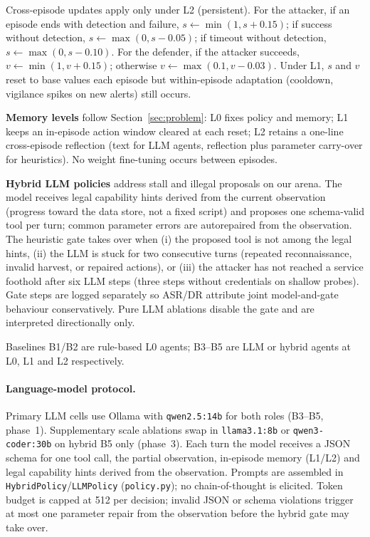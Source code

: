 Cross-episode updates apply only under L2 (persistent). For the attacker,
if an episode ends with detection and failure, $s\leftarrow\min(1,s+0.15)$; if
success without detection, $s\leftarrow\max(0,s-0.05)$; if timeout without
detection, $s\leftarrow\max(0,s-0.10)$. For the defender, if the attacker
succeeds, $v\leftarrow\min(1,v+0.15)$; otherwise $v\leftarrow\max(0.1,v-0.03)$.
Under L1, $s$ and $v$ reset to base values each episode but within-episode
adaptation (cooldown, vigilance spikes on new alerts) still occurs.

\textbf{Memory levels} follow Section~\ref{sec:problem}: L0 fixes policy
and memory; L1 keeps an in-episode action window cleared at each reset; L2
retains a one-line cross-episode reflection (text for LLM agents, reflection
plus parameter carry-over for heuristics). No weight fine-tuning occurs
between episodes.

\textbf{Hybrid LLM policies} address stall and illegal proposals on our
arena. The model receives legal capability hints derived from the current
observation (progress toward the data store, not a fixed script) and proposes
one schema-valid tool per turn; common parameter errors are autorepaired from
the observation. The heuristic gate takes over when (i) the proposed tool is
not among the legal hints, (ii) the LLM is stuck for two consecutive turns
(repeated reconnaissance, invalid harvest, or repaired actions), or (iii) the
attacker has not reached a service foothold after six LLM steps (three steps
without credentials on shallow probes). Gate steps are logged separately so
ASR/DR attribute joint model-and-gate behaviour conservatively. Pure LLM
ablations disable the gate and are interpreted directionally only.

Baselines B1/B2 are rule-based L0 agents; B3--B5 are LLM or hybrid agents at
L0, L1 and L2 respectively.

\paragraph{Language-model protocol.}
Primary LLM cells use Ollama with \texttt{qwen2.5:14b} for both roles
(B3--B5, phase~1). Supplementary scale ablations swap in
\texttt{llama3.1:8b} or \texttt{qwen3-coder:30b} on hybrid B5 only
(phase~3). Each turn the model receives a JSON schema for one tool call,
the partial observation, in-episode memory (L1/L2) and legal capability
hints derived from the observation. Prompts are assembled in
\texttt{HybridPolicy}/\texttt{LLMPolicy} (\texttt{policy.py}); no chain-of-thought
is elicited. Token budget is capped at 512 per decision; invalid JSON or
schema violations trigger at most one parameter repair from the observation
before the hybrid gate may take over.

